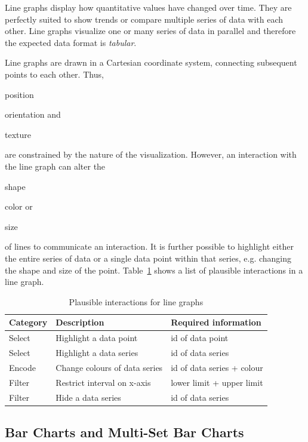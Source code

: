 Line graphs display how quantitative values have changed over time.
They are perfectly suited to show trends or compare multiple series of data with each other.
Line graphs visualize one or many series of data in parallel and therefore the expected data format is \emph{tabular}.

Line graphs are drawn in a Cartesian coordinate system, connecting subsequent points to each other.
Thus,
\begin{enumerate*}[label=(\arabic*)]
    \item position
    \item orientation and
    \item texture
\end{enumerate*}
are constrained by the nature of the visualization.
However, an interaction with the line graph can alter the
\begin{enumerate*}[label=(\arabic*)]
    \item shape
    \item color or
    \item size
\end{enumerate*}
of lines to communicate an interaction.
It is further possible to highlight either the entire series of data or a single data point within that series, e.g. changing the shape and size of the point.
Table~\ref{tab:analysis:line-graph:interactions} shows a list of plausible interactions in a line graph.

\begin{table}[H]
  \centering
  \caption{Plausible interactions for line graphs}%
  \label{tab:analysis:line-graph:interactions}
  \begin{tabular*}{\textwidth}{lll}
    \bf Category & \bf Description & \bf Required information \\
    \hline
    Select & Highlight a data point & id of data point \\
    Select & Highlight a data series & id of data series \\
    Encode & Change colours of data series & id of data series + colour \\
    Filter & Restrict interval on x-axis & lower limit + upper limit \\
    Filter & Hide a data series & id of data series \\
  \end{tabular*}
\end{table}




\subsection{Bar Charts and Multi-Set Bar Charts}

